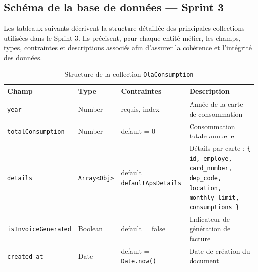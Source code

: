 \documentclass[a4paper,11pt]{report}
\begin{document}
\subsection{Schéma de la base de données — Sprint 3}
Les tableaux suivants décrivent la structure détaillée des principales collections utilisées dans le Sprint 3. Ils précisent, pour chaque entité métier, les champs, types, contraintes et descriptions associés afin d’assurer la cohérence et l’intégrité des données.

\begin{table}[ht]
  \centering
  \small
  \caption{Structure de la collection \texttt{OlaConsumption}}
  \label{tab:olaconsumption-schema}
  \begin{tabularx}{\textwidth}{l X l X}
    \toprule
    \bf Champ                 & \bf Type                                      & \bf Contraintes                    & \bf Description                                                    \\
    \midrule
    \texttt{year}             & Number                                       & requis, index                      & Année de la carte de consommation                                  \\
    \addlinespace
    \texttt{totalConsumption} & Number                                       & default = 0                        & Consommation totale annuelle                                       \\
    \addlinespace
    \texttt{details}          & \texttt{Array\textless{}Obj\textgreater{}}   & default = \texttt{defaultApsDetails} & Détails par carte : \texttt{\{ id, employe, card\_number, dep\_code, location, monthly\_limit, consumptions \}} \\
    \addlinespace
    \texttt{isInvoiceGenerated}& Boolean                                     & default = false                   & Indicateur de génération de facture                                 \\
    \addlinespace
    \texttt{created\_at}      & Date                                         & default = \texttt{Date.now()}     & Date de création du document                                       \\
    \bottomrule
  \end{tabularx}
\end{table}

\vspace{1em}
\end{document}
